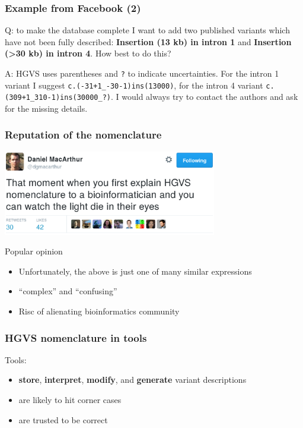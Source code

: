 \documentclass[14pt]{beamer}
\begin{document}
\begin{frame}[fragile]
  \frametitle{Example from Facebook (2)}

  \textcolor{hgvs}{Q}: to make the database complete I want to add two
  published variants which have not been fully described: \textbf{Insertion
    (13 kb) in intron 1} and \textbf{Insertion (>30 kb) in intron 4}. How
  best to do this?\\[1em]

  \pause

  \textcolor{hgvs}{A}: HGVS uses parentheses and \verb|?| to indicate
  uncertainties. For the intron 1 variant I suggest
  \verb|c.(-31+1_-30-1)ins(13000)|, for the intron 4 variant
  \verb|c.(309+1_310-1)ins(30000_?)|. I would always try to contact the
  authors and ask for the missing details.
\end{frame}


\begin{frame}
  \frametitle{Reputation of the nomenclature}
  \begin{center}
    \includegraphics[width=0.7\textwidth]{pictures/twitter.png}
  \end{center}
  \pause
  \begin{block}{Popular opinion}
    \begin{itemize}
      \item Unfortunately, the above is just one of many similar expressions
      \item ``complex'' and ``confusing''
      \item Risc of alienating bioinformatics community
    \end{itemize}
  \end{block}
\end{frame}


\begin{frame}
  \frametitle{\textcolor{hgvs}{HGVS} nomenclature in tools}
  Tools:
  \begin{itemize}[<+->]
    \item \textbf{store}, \textbf{interpret}, \textbf{modify}, and
      \textbf{generate} variant descriptions
    \item are likely to hit corner cases
    \item are trusted to be correct\\[2em]
  \end{itemize}
\end{frame}
\end{document}
